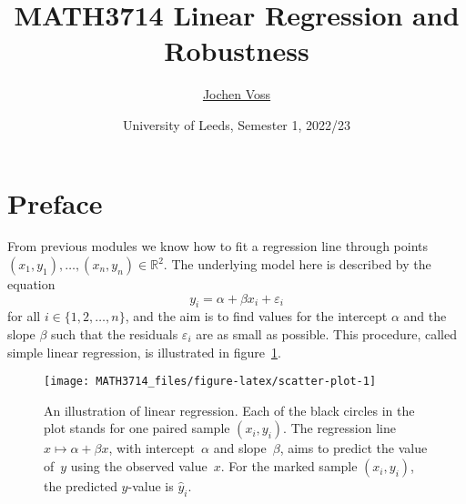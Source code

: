 \documentclass[
  a4paper,
]{article}
\title{MATH3714 Linear Regression and Robustness}
\author{\href{mailto:J.Voss@leeds.ac.uk}{Jochen Voss}}
\date{University of Leeds, Semester 1, 2022/23}
\theoremstyle{definition}
\theoremstyle{definition}
\theoremstyle{definition}
\theoremstyle{definition}
\theoremstyle{remark}
\begin{document}
\maketitle

{
\setcounter{tocdepth}{2}
\tableofcontents
}
\newcommand{\argmin}{\mathop{\mathrm{arg\,min}}\limits}
\newcommand{\bias}{\mathop{\mathrm{bias}}}
\newcommand{\cor}{\mathop{\mathrm{cor}}}
\newcommand{\Cov}{\mathop{\mathrm{Cov}}}
\newcommand{\CN}{\mathcal{N}}
\renewcommand{\d}{\partial}
\newcommand{\ds}{\displaystyle}
\newcommand{\E}{\mathbb{E}}
\newcommand{\eps}{\varepsilon}
\newcommand{\median}{\mathop{\mathrm{median}}}
\newcommand{\MSE}{\mathop{\mathrm{MSE}}\nolimits}
\renewcommand{\phi}{\varphi}
\newcommand{\R}{\mathbb{R}}
\newcommand{\rank}{\mathop{\mathrm{rank}}}
\newcommand{\se}{\mathop{\mathrm{se}}}
\newcommand{\sign}{\mathop{\mathrm{sign}}}
\newcommand{\stdev}{\mathop{\mathrm{stdev}}}
\newcommand{\tr}{\mathop{\mathrm{tr}}}
\newcommand{\Var}{\mathop{\mathrm{Var}}}
\newcommand{\xfrac}[2]{\frac{\,#1\,}{\,#2\,}}

\hypertarget{home}{%
\section*{Preface}\label{home}}

From previous modules we know how to fit a regression line through
points \((x_1, y_1), \ldots, (x_n, y_n) \in\mathbb{R}^2\). The underlying model
here is described by the equation
\begin{equation*}
  y_i
  = \alpha + \beta x_i + \varepsilon_i
\end{equation*}
for all \(i \in \{1, 2, \ldots, n\}\), and the aim is to find values for
the intercept \(\alpha\) and the slope \(\beta\) such that the residuals
\(\varepsilon_i\) are as small as possible. This procedure, called simple
linear regression, is illustrated in figure~\ref{fig:scatter-plot}.



\begin{figure}

{\centering \texttt{[image: MATH3714\_files/figure-latex/scatter-plot-1]} 

}

\caption{An illustration of linear regression. Each of the black circles in the plot stands for one paired sample \((x_i, y_i)\). The regression line \(x \mapsto \alpha + \beta x\), with intercept~\(\alpha\) and slope~\(\beta\), aims to predict the value of~\(y\) using the observed value~\(x\). For the marked sample \((x_i, y_i)\), the predicted \(y\)-value is \(\hat y_i\).}\label{fig:scatter-plot}
\end{figure}
\end{document}
